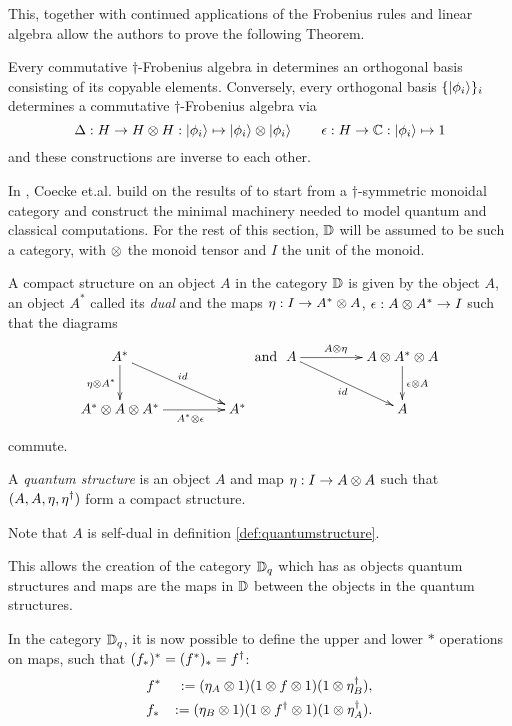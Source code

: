 This, together with continued applications of the Frobenius rules and linear algebra allow the
authors to prove the following Theorem.
\begin{theorem}
  Every commutative $\dagger$-Frobenius algebra in \fdh determines an orthogonal basis consisting
  of its copyable elements. Conversely, every orthogonal basis $\{\left\vert{\phi_{i}}\right\rangle\}_{i}$ determines
  a commutative $\dagger$-Frobenius algebra via \[\Delta:H\to H\otimes H: \left\vert{\phi_{i}}\right\rangle\mapsto
  \left\vert{\phi_{i}}\right\rangle \otimes \left\vert{\phi_{i}}\right\rangle\qquad\epsilon : H\to \mathbb{C} : \left\vert{\phi_{i}}\right\rangle \mapsto 1\] and these
  constructions are inverse to each other.
\end{theorem}

In \cite{coecke08structures}, Coecke et.al. build on the results of \cite{coeckeetal08:ortho}
to start from a $\dagger$-symmetric monoidal category and construct the minimal machinery needed to
model quantum and classical computations. For the rest of this section, $\mathbb{D}$ will be assumed to be
such a category, with $\otimes$ the monoid tensor and $I$ the unit of the monoid.

\begin{definition}\label{def:compact_structure}
  A compact structure on an object $A$ in the category $\mathbb{D}$ is given by the object $A$, an object
  $A^{*}$ called its \emph{dual} and the maps $\eta:I \to A^{*}\otimes A$, $\epsilon: A\otimes A^{*} \to I$
  such that the diagrams
  \[
    \xymatrix@C+20pt{
      A^{*} \ar[dr]^{id} \ar[d]_{\eta\*A^{*}} \\
      A^{*} \*A\*A^{*}  \ar[r]_(.6){A^{*} \*\epsilon} & A^{*}
    }
    \text{ and }
    \xymatrix@C+20pt{
      A \ar[r]^(.4){A\*\eta} \ar[dr]_{id} & A\* A^{*}\* A \ar[d]^{\epsilon\*A}\\
      & A
    }
  \]
  commute.
\end{definition}

\begin{definition}\label{def:quantumstructure}
  A \emph{quantum structure} is an object $A$ and map $\eta:I\to A\otimes A$ such that
  $(A,A,\eta,{\eta}^{\dagger})$ form a compact structure.
\end{definition}
Note that $A$ is self-dual in definition \ref{def:quantumstructure}.

This allows the creation of the category $\mathbb{D}_{q}$ which has as objects quantum structures and maps
are the maps in $\mathbb{D}$ between the objects in the quantum structures.

In the category $\mathbb{D}_{q}$, it is now possible to define the upper and lower $*$ operations on maps,
such that $(f_{*})^{*}= (f^{*})_{*} = {f}^{\dagger}$:
\begin{eqnarray*}
&f^{*} &:= (\eta_{A}\otimes1) (1 \otimes f\otimes1) (1\otimes{\eta}^{\dagger}_{B}),\\
&f_{*} &:= (\eta_{B}\otimes1) (1 \otimes {f}^{\dagger}\otimes1) (1\otimes{\eta}^{\dagger}_{A}).
\end{eqnarray*}

